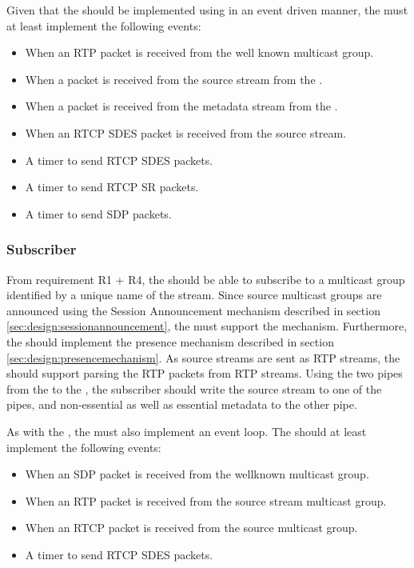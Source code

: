 Given that the \pub{} should be implemented using in an event driven manner, the \pub{} must at least implement the following events:

\begin{itemize}
	\item When an RTP packet is received from the well known multicast group.
	\item When a packet is received from the source stream from the \pro{}.
	\item When a packet is received from the metadata stream from the \pro{}.
	\item When an RTCP SDES packet is received from the source stream.
	\item A timer to send RTCP SDES packets.
	\item A timer to send RTCP SR packets.
	\item A timer to send SDP packets.
\end{itemize}

\subsubsection{Subscriber} \label{sec:design:subscriber}
From requirement R1 + R4, the \sub{} should be able to subscribe to a multicast group identified by a unique name of the stream. Since source multicast groups are announced using the Session Announcement mechanism described in section \ref{sec:design:sessionannouncement}, the \sub{} must support the mechanism. Furthermore, the \sub{} should implement the presence mechanism described in section \ref{sec:design:presencemechanism}. As source streams are sent as RTP streams, the \sub{} should support parsing the RTP packets from RTP streams. Using the two pipes from the \sub{} to the \con{}, the subscriber should write the source stream to one of the pipes, and non-essential as well as essential metadata to the other pipe.

As with the \pub{}, the \sub{} must also implement an event loop. The \sub{} should at least implement the following events:

\begin{itemize}
	\item When an SDP packet is received from the wellknown multicast group.
	\item When an RTP packet is received from the source stream multicast group.
	\item When an RTCP packet is received from the source multicast group.
	\item A timer to send RTCP SDES packets.
\end{itemize}



